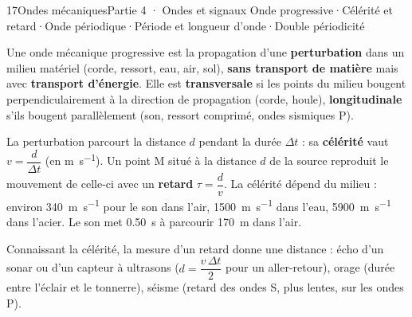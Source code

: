 \begin{ouverture}[son]{17}{Ondes mécaniques}{Partie 4 · Ondes et signaux}
{Onde progressive\enspace·\enspace Célérité et retard\enspace·\enspace Onde périodique\enspace·\enspace Période et longueur d'onde\enspace·\enspace Double périodicité}
\end{ouverture}
\essentiel
{}
\begin{definition}
Une onde mécanique progressive est la propagation d'une \textbf{perturbation} dans un milieu matériel (corde, ressort, eau, air,
sol), \textbf{sans transport de matière} mais avec \textbf{transport d'énergie}. Elle est \textbf{transversale} si les points du milieu bougent
perpendiculairement à la direction de propagation (corde, houle), \textbf{longitudinale} s'ils bougent parallèlement (son, ressort
comprimé, ondes sismiques P).
\end{definition}
\begin{loi}
La perturbation parcourt la distance $d$ pendant la durée $\Delta t$ : sa \textbf{célérité} vaut $v=\dfrac{d}{\Delta t}$ (en \unit{m.s^{-1}}). Un point M situé à la distance
$d$ de la source reproduit le mouvement de celle-ci avec un \textbf{retard} $\tau=\dfrac{d}{v}$. La célérité dépend du milieu : environ
\qty{340}{m.s^{-1}} pour le son dans l'air, \qty{1500}{m.s^{-1}} dans l'eau, \qty{5900}{m.s^{-1}} dans l'acier. Le son met \qty{0,50}{s} à parcourir \qty{170}{m} dans l'air.
\end{loi}
\par{}
\begin{propriete}
Connaissant la célérité, la mesure d'un retard donne une distance : écho d'un sonar ou d'un capteur à ultrasons ($d=\dfrac{v\,\Delta t}{2}$
pour un aller-retour), orage (durée entre l'éclair et le tonnerre), séisme (retard des ondes S, plus lentes, sur les ondes P).
\end{propriete}
